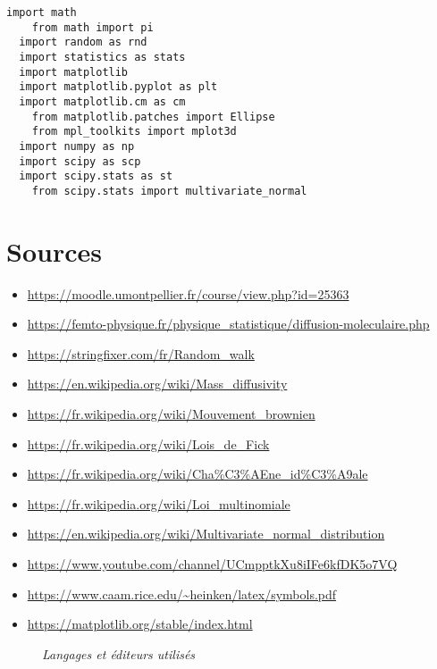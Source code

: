 \documentclass{report}
\begin{document}
\begin{lstlisting}[caption={\it Modules utilisés en Python 3.9.2}, label=annexe]
  import math
    from math import pi
  import random as rnd
  import statistics as stats
  import matplotlib
  import matplotlib.pyplot as plt
  import matplotlib.cm as cm
    from matplotlib.patches import Ellipse
    from mpl_toolkits import mplot3d
  import numpy as np
  import scipy as scp
  import scipy.stats as st
    from scipy.stats import multivariate_normal

\end{lstlisting}

\chapter{Sources}

\begin{itemize}
  \item \url{https://moodle.umontpellier.fr/course/view.php?id=25363}
  \item \url{https://femto-physique.fr/physique_statistique/diffusion-moleculaire.php}
  \item \url{https://stringfixer.com/fr/Random_walk}
  \item \url{https://en.wikipedia.org/wiki/Mass_diffusivity}
  \item \url{https://fr.wikipedia.org/wiki/Mouvement_brownien}
  \item \url{https://fr.wikipedia.org/wiki/Lois_de_Fick}
  \item \url{https://fr.wikipedia.org/wiki/Cha%C3%AEne_id%C3%A9ale}
  \item \url{https://fr.wikipedia.org/wiki/Loi_multinomiale}
  \item \url{https://en.wikipedia.org/wiki/Multivariate_normal_distribution}
  \item \url{https://www.youtube.com/channel/UCmpptkXu8iIFe6kfDK5o7VQ}
  \item \url{https://www.caam.rice.edu/~heinken/latex/symbols.pdf}
  \item \url{https://matplotlib.org/stable/index.html}
\end{itemize}

\begin{figure}
  \centering

  \caption{\it Langages et éditeurs utilisés}
\end{figure}
\end{document}
